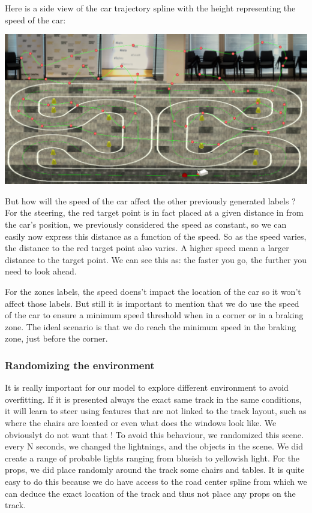 \documentclass[12pt]{article}
\begin{document}
Here is a side view of the car trajectory spline with the height representing the speed of the car: \\
\centerline{\includegraphics[width=15cm]{../../docs/sim-speed.png}} 

But how will the speed of the car affect the other previously generated labels ? \\

For the steering, the red target point is in fact placed at a given distance in from the car's position, we previously considered the speed as constant, so we can easily now express this distance as a function of the speed. So as the speed varies, the distance to the red target point also varies. A higher speed mean a larger distance to the target point. We can see this as: the faster you go, the further you need to look ahead.

For the zones labels, the speed doens't impact the location of the car so it won't affect those labels. But still it is important to mention that we do use the speed of the car to ensure a minimum speed threshold when in a corner or in a braking zone. The ideal scenario is that we do reach the minimum speed in the braking zone, just before the corner.


\subsubsection{Randomizing the environment}
It is really important for our model to explore different environment to avoid overfitting. If it is presented always the exact same track in the same conditions, it will learn to steer using features that are not linked to the track layout, such as where the chairs are located or even what does the windows look like. We obviouslyt do not want that !
To avoid this behaviour, we randomized this scene. every N seconds, we changed the lightnings, and the objects in the scene. We did create a range of probable lights ranging from blueish to yellowish light. For the props, we did place randomly around the track some chairs and tables. It is quite easy to do this because we do have access to the road center spline from which we can deduce the exact location of the track and thus not place any props on the track. \\
\end{document}
